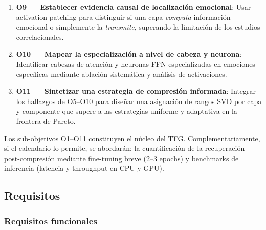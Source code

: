 \documentclass[11pt, a4paper]{article}
\begin{document}
\begin{enumerate}[nosep]
    \item \textbf{O9 --- Establecer evidencia causal de localización emocional}: Usar activation patching para distinguir si una capa \textit{computa} información emocional o simplemente la \textit{transmite}, superando la limitación de los estudios correlacionales.
    \item \textbf{O10 --- Mapear la especialización a nivel de cabeza y neurona}: Identificar cabezas de atención y neuronas FFN especializadas en emociones específicas mediante ablación sistemática y análisis de activaciones.
    \item \textbf{O11 --- Sintetizar una estrategia de compresión informada}: Integrar los hallazgos de O5--O10 para diseñar una asignación de rangos SVD por capa y componente que supere a las estrategias uniforme y adaptativa en la frontera de Pareto.
\end{enumerate}

Los sub-objetivos O1--O11 constituyen el núcleo del TFG. Complementariamente, si el calendario lo permite, se abordarán: la cuantificación de la recuperación post-compresión mediante fine-tuning breve (2--3 epochs) y benchmarks de inferencia (latencia y throughput en CPU y GPU).

\subsection{Requisitos}

\subsubsection{Requisitos funcionales}
\end{document}
